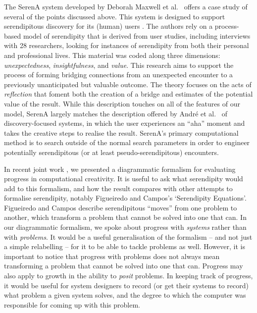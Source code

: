 The {\sf SerenA} system developed by Deborah Maxwell et al.~\citeyear{maxwell2012designing} offers a case study of several of the points discussed above.
This system is designed to support serendipitous discovery for its (human) users
\cite{forth2013serena}.  The authors rely on a process-based model of
serendipity \cite{Makri2012,Makri2012a} that is derived from user
studies, including interviews with 28 researchers, looking for
instances of serendipity from both their personal and professional
lives.  This material was coded along three dimensions:
\emph{unexpectedness}, \emph{insightfulness}, and \emph{value}.  This
research aims to support the process of forming bridging connections
from an unexpected encounter to a previously unanticipated but valuable
outcome.  The theory focuses on the acts of \emph{reflection}
that foment both the creation of a bridge and estimates of the
potential value of the result.
%
While this description touches on all of the features of our model, {\sf
  SerenA} largely matches the description offered by Andr{\'e} et
al.~\citeyear{andre2009discovery} of discovery-focused systems, in which
the user experiences an ``aha'' moment and takes the
creative steps to realise the result.  {\sf SerenA}'s primary computational method is to
search outside of the normal search parameters in order to engineer
potentially serendipitous (or at least pseudo-serendipitous)
encounters.

In recent joint work \cite{colton-assessingprogress}, we presented a
diagrammatic formalism for evaluating progress in computational
creativity.  It is useful to ask what serendipity would add to this
formalism, and how the result compares with other attempts to
formalise serendipity, notably Figueiredo and Campos's
\citeyear{Figueiredo2001} `Serendipity Equations'.  
Figueiredo and Campos describe serendipitous ``moves'' from one
problem to another, which transform a problem that cannot be solved
into one that can.  In our diagrammatic formalism, we spoke about
progress with \emph{systems} rather than with \emph{problems}.  It
would be a useful generalisation of the formalism -- and not just a
simple relabelling -- for it to be able to tackle problems as well.
However, it is important to notice that progress with problems does not always mean transforming a
problem that cannot be solved into one that can.  Progress may also
apply to growth in the ability to \emph{posit} problems.  In keeping
track of progress, it would be useful for system designers to record
(or get their systems to record) what problem a given system solves,
and the degree to which the computer was responsible for coming up
with this problem.

